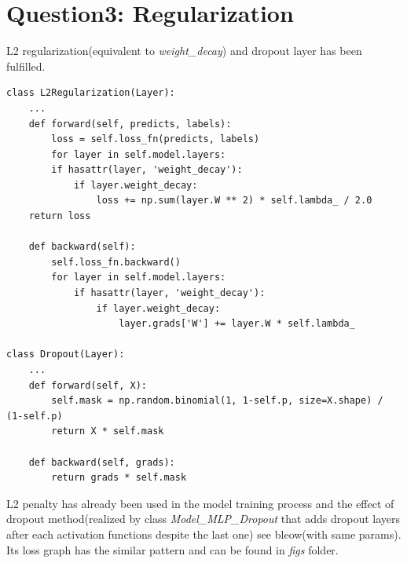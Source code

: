 \documentclass[]{article}
\begin{document}
	\begin{figure}[H]
	\centering
	\hfill
\end{figure}

\section{Question3: Regularization}

L2 regularization(equivalent to \textit{weight\_decay}) and dropout layer has been fulfilled.

\begin{lstlisting}
class L2Regularization(Layer):
	...
	def forward(self, predicts, labels):
		loss = self.loss_fn(predicts, labels)
		for layer in self.model.layers:
		if hasattr(layer, 'weight_decay'):
			if layer.weight_decay:
				loss += np.sum(layer.W ** 2) * self.lambda_ / 2.0
	return loss

	def backward(self):
		self.loss_fn.backward()
		for layer in self.model.layers:
			if hasattr(layer, 'weight_decay'):
				if layer.weight_decay:
					layer.grads['W'] += layer.W * self.lambda_

class Dropout(Layer):
	...
	def forward(self, X):
		self.mask = np.random.binomial(1, 1-self.p, size=X.shape) / (1-self.p)
		return X * self.mask

	def backward(self, grads):
		return grads * self.mask
\end{lstlisting}

L2 penalty has already been used in the model training process and the effect of dropout method(realized by class \textit{Model\_MLP\_Dropout} that adds dropout layers after each activation functions despite the last one) see bleow(with same params). Its loss graph has the similar pattern and can be found in \textit{figs} folder.
\end{document}
